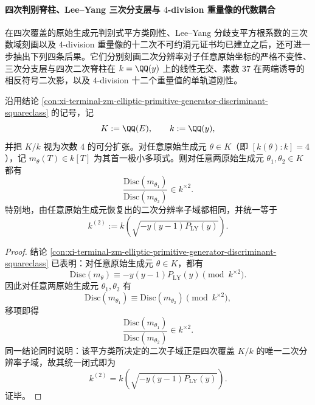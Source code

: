 \paragraph{四次判别脊柱、Lee--Yang 三次分支层与 \texorpdfstring{$4$}{4}-division 重量像的代数耦合}
在四次覆盖的原始生成元判别式平方类刚性、Lee--Yang 分歧支平方根系数的三次数域刻画以及 \(4\)-division 重量像的十二次不可约消元证书均已建立之后，还可进一步抽出下列四条后果。它们分别刻画二次分辨率对子任意原始坐标的严格不变性、三次分支层与四次二次脊柱在 \(k=\QQ(y)\) 上的线性无交、素数 \(37\) 在两端诱导的相反符号二次影，以及 \(4\)-division 十二个重量值的单轨道刚性。

\begin{theorem}\label{thm:xi-terminal-zm-leyang-quadratic-resolvent-primitive-generator-invariance}
沿用结论 \ref{con:xi-terminal-zm-elliptic-primitive-generator-discriminant-squareclass} 的记号，记
\[
K:=\QQ(E),\qquad k:=\QQ(y),
\]
并把 \(K/k\) 视为次数 \(4\) 的可分扩张。对任意原始生成元 \(\theta\in K\)（即 \([k(\theta):k]=4\)），记 \(m_\theta(T)\in k[T]\) 为其首一极小多项式。则对任意两原始生成元 \(\theta_1,\theta_2\in K\) 都有
\[
\frac{\mathrm{Disc}(m_{\theta_1})}{\mathrm{Disc}(m_{\theta_2})}\in k^{\times 2}.
\]
特别地，由任意原始生成元恢复出的二次分辨率子域都相同，并统一等于
\[
k^{(2)}:=k\!\left(\sqrt{-y(y-1)P_{\mathrm{LY}}(y)}\right).
\]
\end{theorem}
\begin{proof}
结论 \ref{con:xi-terminal-zm-elliptic-primitive-generator-discriminant-squareclass} 已表明：对任意原始生成元 \(\theta\in K\)，都有
\[
\mathrm{Disc}(m_\theta)\equiv -y(y-1)P_{\mathrm{LY}}(y)\pmod{k^{\times 2}}.
\]
因此对任意两原始生成元 \(\theta_1,\theta_2\) 有
\[
\mathrm{Disc}(m_{\theta_1})\equiv \mathrm{Disc}(m_{\theta_2})\pmod{k^{\times 2}},
\]
移项即得
\[
\frac{\mathrm{Disc}(m_{\theta_1})}{\mathrm{Disc}(m_{\theta_2})}\in k^{\times 2}.
\]
同一结论同时说明：该平方类所决定的二次子域正是四次覆盖 \(K/k\) 的唯一二次分辨率子域，故其统一闭式即为
\[
k^{(2)}=k\!\left(\sqrt{-y(y-1)P_{\mathrm{LY}}(y)}\right).
\]
证毕。
\end{proof}

